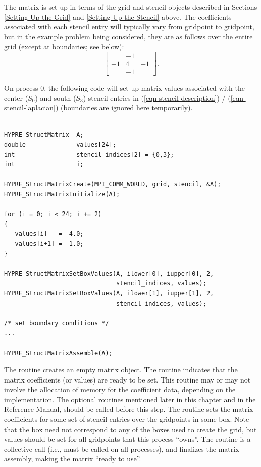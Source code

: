 The matrix is set up in terms of the grid and stencil objects
described in Sections
\ref{Setting Up the Grid} and \ref{Setting Up the Stencil} above.
The coefficients associated with each stencil entry will typically
vary from gridpoint to gridpoint, but in the example problem being
considered, they are as follows over the entire grid (except at
boundaries; see below):
\begin{equation}\label{eqn-stencil-laplacian}
\left [
\begin{array}{ccc}
    & -1 &    \\
 -1 &  4 & -1 \\
    & -1 &    
\end{array}
\right ] .
\end{equation}

On process 0, the following code will set up matrix values associated
with the center ($S_0$) and south ($S_3$) stencil entries in
(\ref{eqn-stencil-description}) / (\ref{eqn-stencil-laplacian})
(boundaries are ignored here temporarily).
\begin{display}
\begin{verbatim}

HYPRE_StructMatrix  A;
double              values[24];
int                 stencil_indices[2] = {0,3};
int                 i;

HYPRE_StructMatrixCreate(MPI_COMM_WORLD, grid, stencil, &A);
HYPRE_StructMatrixInitialize(A);

for (i = 0; i < 24; i += 2)
{
   values[i]   =  4.0;
   values[i+1] = -1.0;
}

HYPRE_StructMatrixSetBoxValues(A, ilower[0], iupper[0], 2,
                               stencil_indices, values);
HYPRE_StructMatrixSetBoxValues(A, ilower[1], iupper[1], 2,
                               stencil_indices, values);

/* set boundary conditions */
...

HYPRE_StructMatrixAssemble(A);

\end{verbatim}
\end{display}
The  routine creates an empty matrix
object.  The  routine indicates
that the matrix coefficients (or values) are ready to be set.  This
routine may or may not involve the allocation of memory for the
coefficient data, depending on the implementation.  The optional
 routines mentioned later in this chapter and in the
Reference Manual, should be called before this step.  The
 routine sets the matrix
coefficients for some set of stencil entries over the gridpoints in
some box.  Note that the box need not correspond to any of the boxes
used to create the grid, but values should be set for all gridpoints
that this process ``owns''.  The 
routine is a collective call (i.e., must be called on all processes),
and finalizes the matrix assembly, making the matrix ``ready to use''.

